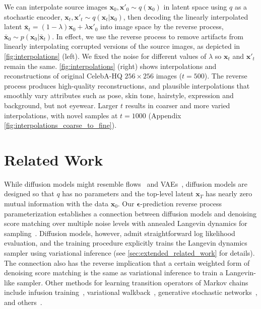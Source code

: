 We can interpolate source images $\mathbf{x}_0, \mathbf{x}'_0 \sim q(\mathbf{x}_0)$ in latent space using $q$ as a stochastic encoder, $\mathbf{x}_t, \mathbf{x}'_t \sim q(\mathbf{x}_t | \mathbf{x}_0)$, then decoding the linearly interpolated latent $\bar{\mathbf{x}}_t = (1-\lambda) \mathbf{x}_0 + \lambda \mathbf{x}'_0$ into image space by the reverse process, $\bar{\mathbf{x}}_0 \sim p(\mathbf{x}_0 | \bar{\mathbf{x}}_t)$. In effect, we use the reverse process to remove artifacts from linearly interpolating corrupted versions of the source images, as depicted in \ref{fig:interpolations} (left). We fixed the noise for different values of $\lambda$ so $\mathbf{x}_t$ and $\mathbf{x}'_t$ remain the same. \ref{fig:interpolations} (right) shows interpolations and reconstructions of original CelebA-HQ $256 \times 256$ images ($t=500$). The reverse process produces high-quality reconstructions, and plausible interpolations that smoothly vary attributes such as pose, skin tone, hairstyle, expression and background, but not eyewear. Larger $t$ results in coarser and more varied interpolations, with novel samples at $t=1000$ (Appendix \ref{fig:interpolations_coarse_to_fine}).

\section{Related Work}

While diffusion models might resemble flows~\citep{dinh2014nice,rezende2015variational,dinh2016density,kingma2018glow,chen2018neural,grathwohl2019ffjord,ho2019flow++} and VAEs~\citep{kingma2013auto,rezende2014stochastic,maaloe2019biva}, diffusion models are designed so that $q$ has no parameters and the top-level latent $\mathbf{x}_T$ has nearly zero mutual information with the data $\mathbf{x}_0$.
Our ${\boldsymbol{\epsilon}}$-prediction reverse process parameterization establishes a connection between diffusion models and denoising score matching over multiple noise levels with annealed Langevin dynamics for sampling~\citep{song2019generative,song2020improved}. Diffusion models, however, admit straightforward log likelihood evaluation, and the training procedure explicitly trains the Langevin dynamics sampler using variational inference (see \ref{sec:extended_related_work} for details). The connection also has the reverse implication that a certain weighted form of denoising score matching is the same as variational inference to train a Langevin-like sampler. Other methods for learning transition operators of Markov chains include infusion training~\citep{bordes2016learning}, variational walkback~\citep{goyal2017variational}, generative stochastic networks~\citep{alain2016gsns}, and others~\citep{salimans2015markov,song2017nice,levy2018generalizing,nijkamp2019learning,lawson2019energy,wu2020stochastic}.

